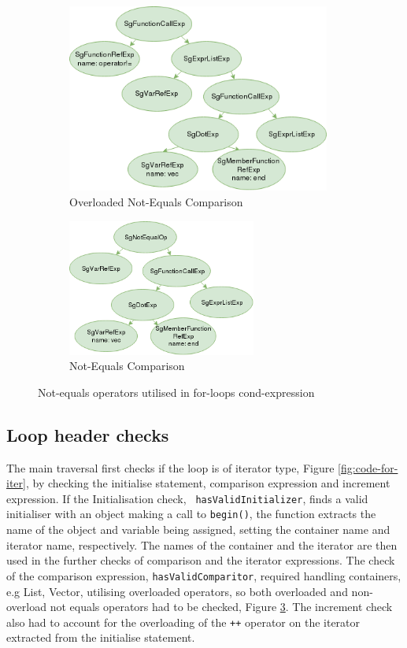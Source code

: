 \documentclass[bsc,frontabs,singlespacing,twoside,parskip,deptreport]{infthesis}
\begin{document}
\begin{figure}[H]
    \centering
    
    \begin{subfigure}[b]{0.5\textwidth}
        \centering
        \includegraphics[height=6.2cm]{images/overloaded-cmp.png}
        \caption{Overloaded Not-Equals Comparison}
        \label{for-cmp-neq-overloaded}
    \end{subfigure}
  \hfill
  \begin{subfigure}[b]{0.4\textwidth}
        \centering
        \includegraphics[height=4.5cm]{images/non-overloaded-cmp.png}    
        \caption{Not-Equals Comparison}
        \label{fig:for-cmp-neq}
    \end{subfigure}
    
    \caption{Not-equals operators utilised in for-loops cond-expression}
    \label{fig:comp-operators}
\end{figure}


\subsection{Loop header checks}

The main traversal first checks if the loop is of iterator type, Figure \ref{fig:code-for-iter}, by checking the initialise statement, comparison expression and increment expression. If the Initialisation check, \texttt{ hasValidInitializer}, finds a valid initialiser with an object making a call to \texttt{begin()}, the function extracts the name of the object and variable being assigned, setting the container name and iterator name, respectively. The names of the container and the iterator are then used in the further checks of comparison and the iterator expressions. The check of the comparison expression, \texttt{hasValidComparitor}, required handling containers, e.g List, Vector, utilising overloaded operators, so both overloaded and non-overload not equals operators had to be checked, Figure \ref{fig:comp-operators}. The increment check also had to account for the overloading of the \texttt{++} operator on the iterator extracted from the initialise statement. 
\end{document}
